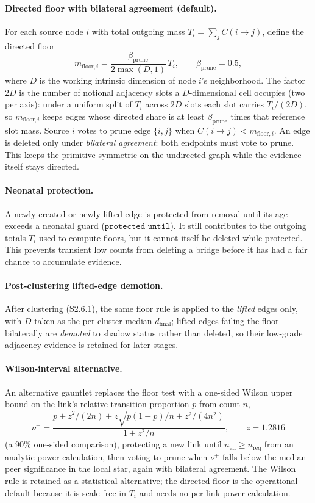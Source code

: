 \documentclass[11pt]{article}
\begin{document}
\paragraph{Directed floor with bilateral agreement (default).}
For each source node $i$ with total outgoing mass $T_i=\sum_j C(i\!\to\! j)$, define the directed floor
\[
m_{\mathrm{floor},i}=\frac{\beta_{\mathrm{prune}}}{2\max(D,1)}\,T_i,
\qquad \beta_{\mathrm{prune}}=0.5,
\label{eq:si-directed-floor}
\]
where $D$ is the working intrinsic dimension of node $i$'s neighborhood. The factor $2D$ is the number of notional adjacency slots a $D$-dimensional cell occupies (two per axis): under a uniform split of $T_i$ across $2D$ slots each slot carries $T_i/(2D)$, so $m_{\mathrm{floor},i}$ keeps edges whose directed share is at least $\beta_{\mathrm{prune}}$ times that reference slot mass. Source $i$ votes to prune edge $\{i,j\}$ when $C(i\!\to\! j)<m_{\mathrm{floor},i}$. An edge is deleted only under \emph{bilateral agreement}: both endpoints must vote to prune. This keeps the primitive symmetric on the undirected graph while the evidence itself stays directed.

\paragraph{Neonatal protection.}
A newly created or newly lifted edge is protected from removal until its age exceeds a neonatal guard ($\texttt{protected\_until}$). It still contributes to the outgoing totals $T_i$ used to compute floors, but it cannot itself be deleted while protected. This prevents transient low counts from deleting a bridge before it has had a fair chance to accumulate evidence.

\paragraph{Post-clustering lifted-edge demotion.}
After clustering (S2.6.1), the same floor rule is applied to the \emph{lifted} edges only, with $D$ taken as the per-cluster median $d_{\mathrm{final}}$; lifted edges failing the floor bilaterally are \emph{demoted} to shadow status rather than deleted, so their low-grade adjacency evidence is retained for later stages.

\paragraph{Wilson-interval alternative.}
An alternative gauntlet replaces the floor test with a one-sided Wilson upper bound on the link's relative transition proportion $p$ from count $n$,
\[
\nu^+
=
\frac{
p+z^2/(2n)+z\sqrt{p(1-p)/n+z^2/(4n^2)}
}{
1+z^2/n
},
\qquad z=1.2816
\label{eq:si-wilson-link}
\]
(a 90\% one-sided comparison), protecting a new link until $n_{\mathrm{eff}}\ge n_{\mathrm{req}}$ from an analytic power calculation, then voting to prune when $\nu^+$ falls below the median peer significance in the local star, again with bilateral agreement. The Wilson rule is retained as a statistical alternative; the directed floor is the operational default because it is scale-free in $T_i$ and needs no per-link power calculation.
\end{document}
